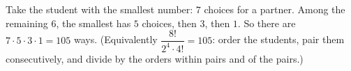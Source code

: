 Take the student with the smallest number: $7$ choices for a partner. Among the remaining $6$, the smallest has $5$ choices, then $3$, then $1$. So there are $7\cdot5\cdot3\cdot1=\boxed{105}$ ways. (Equivalently $\dfrac{8!}{2^4\cdot4!}=105$: order the students, pair them consecutively, and divide by the orders within pairs and of the pairs.)
